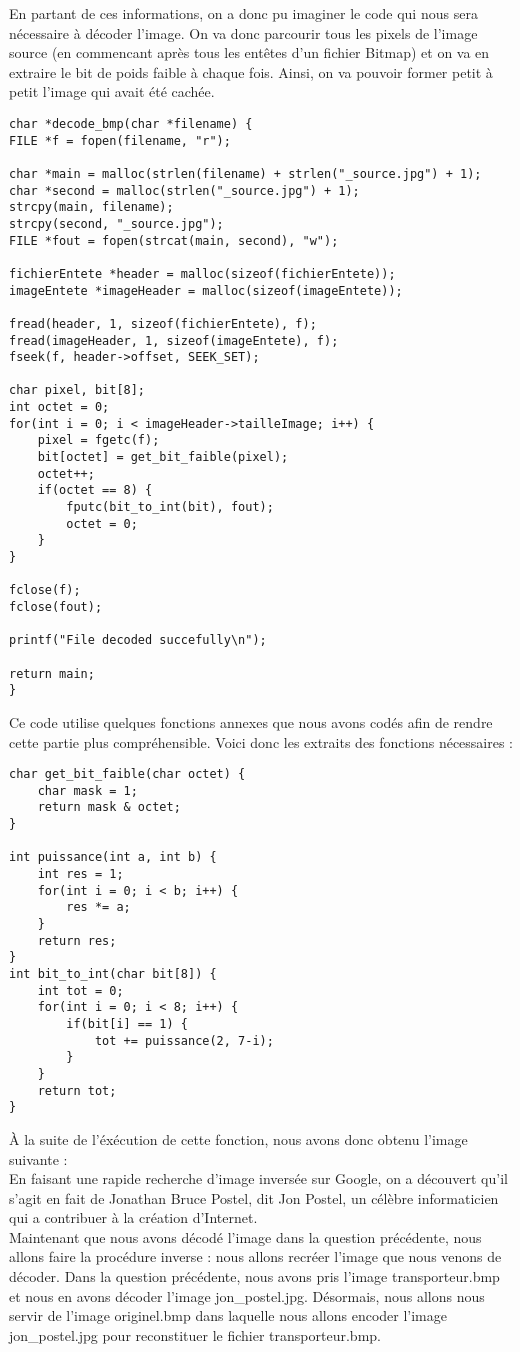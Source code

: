 \documentclass[12pt]{article}
\begin{document}
En partant de ces informations, on a donc pu imaginer le code qui nous sera nécessaire à décoder l'image. On va donc parcourir tous les pixels de l'image source (en commencant après tous les entêtes d'un fichier Bitmap) et on va en extraire le bit de poids faible à chaque fois. Ainsi, on va pouvoir former petit à petit l'image qui avait été cachée.
\begin{lstlisting}[style=languageClarge, caption=Code pour décoder une image]
char *decode_bmp(char *filename) {
FILE *f = fopen(filename, "r");

char *main = malloc(strlen(filename) + strlen("_source.jpg") + 1);
char *second = malloc(strlen("_source.jpg") + 1);
strcpy(main, filename);
strcpy(second, "_source.jpg");
FILE *fout = fopen(strcat(main, second), "w");

fichierEntete *header = malloc(sizeof(fichierEntete));
imageEntete *imageHeader = malloc(sizeof(imageEntete));

fread(header, 1, sizeof(fichierEntete), f);
fread(imageHeader, 1, sizeof(imageEntete), f);
fseek(f, header->offset, SEEK_SET);

char pixel, bit[8];
int octet = 0;
for(int i = 0; i < imageHeader->tailleImage; i++) {
    pixel = fgetc(f);
    bit[octet] = get_bit_faible(pixel);
    octet++;
    if(octet == 8) {
        fputc(bit_to_int(bit), fout);
        octet = 0;
    }
}

fclose(f);
fclose(fout);

printf("File decoded succefully\n");

return main;
}
\end{lstlisting}
Ce code utilise quelques fonctions annexes que nous avons codés afin de rendre cette partie plus compréhensible. Voici donc les extraits des fonctions nécessaires :
\begin{lstlisting}[style=languageClarge, caption=Fonctions annexes]
char get_bit_faible(char octet) {
    char mask = 1;
    return mask & octet;
}

int puissance(int a, int b) {
    int res = 1;
    for(int i = 0; i < b; i++) {
        res *= a;
    }
    return res;
}
int bit_to_int(char bit[8]) {
    int tot = 0;
    for(int i = 0; i < 8; i++) {
        if(bit[i] == 1) {
            tot += puissance(2, 7-i);
        }
    }
    return tot;
}
\end{lstlisting}
À la suite de l'éxécution de cette fonction, nous avons donc obtenu l'image suivante : \\
En faisant une rapide recherche d'image inversée sur Google, on a découvert qu'il s'agit en fait de Jonathan Bruce Postel, dit Jon Postel, un célèbre informaticien qui a contribuer à la création d'Internet. \\
Maintenant que nous avons décodé l'image dans la question précédente, nous allons faire la procédure inverse : nous allons recréer l'image que nous venons de décoder. Dans la question précédente, nous avons pris l'image transporteur.bmp et nous en avons décoder l'image jon_postel.jpg. Désormais, nous allons nous servir de l'image originel.bmp dans laquelle nous allons encoder l'image jon_postel.jpg pour reconstituer le fichier transporteur.bmp.
\end{document}
